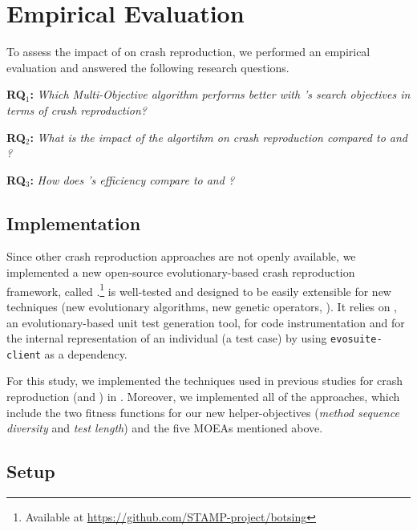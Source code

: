 

\section{Empirical Evaluation}
\label{sec:setup}
To assess the impact of \moho on crash reproduction, we performed an empirical evaluation and answered the following research questions.

\textbf{RQ$_1$: } \textit{Which Multi-Objective algorithm performs better with \moho's search objectives in terms of crash reproduction?}

\textbf{RQ$_2$: } \textit{What is the impact of the \moho algortihm on crash reproduction compared to \SGGA and \decomposition?}

\textbf{RQ$_3$: } \textit{How does \moho's efficiency compare to \SGGA and \decomposition?}



\subsection{Implementation}
\label{sec:approach:implementation}
Since other crash reproduction approaches are not openly available, we implemented a new open-source evolutionary-based crash reproduction framework, called \botsing.\footnote{Available at \url{https://github.com/STAMP-project/botsing}}
\botsing is well-tested and designed to be easily extensible for new techniques (new evolutionary algorithms, new genetic operators, \etc). It relies on \evosuite \cite{Fraser2011}, an evolutionary-based unit test generation tool, for code instrumentation and for the internal representation of an individual (\ie a test case) by using \texttt{e\-vo\-suite-cli\-ent} as a dependency.

For this study, we implemented the techniques used in previous studies for crash reproduction (\SGGA and \decomposition) in \botsing. Moreover, we implemented all of the \moho approaches, which include the two fitness functions for our new helper-objectives (\textit{method sequence diversity} and \textit{test length}) and the five MOEAs mentioned above.

\subsection{Setup}
\label{sec:approach:setup}
